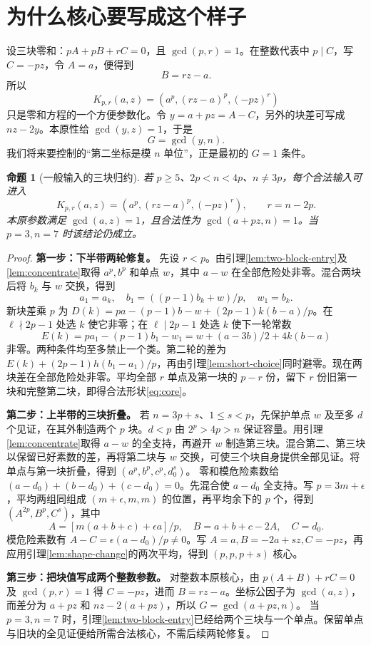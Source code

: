 \documentclass[11pt,a4paper,oneside,openany]{book}
\newtheorem{proposition}[theorem]{命题}
\theoremstyle{definition}
\numberwithin{equation}{chapter}
\begin{document}
\section{为什么核心要写成这个样子}
设三块零和：$pA+pB+rC=0$，且 $\gcd(p,r)=1$。在整数代表中 $p\mid C$，写 $C=-pz$，令 $A=a$，便得到
\[B=rz-a.
\]
所以
\[K_{p,r}(a,z)=(a^p,(rz-a)^p,(-pz)^r)
\]
只是零和方程的一个方便参数化。令 $y=a+pz=A-C$，另外的块差可写成 $nz-2y$。本原性给 $\gcd(y,z)=1$，于是
\[G=\gcd(y,n).
\]
我们将来要控制的“第二坐标是模 $n$ 单位”，正是最初的 $G=1$ 条件。
\begin{proposition}[一般输入的三块归约]\label{prop:entry}
若 $p\ge5$、$2p<n<4p$、$n\ne3p$，每个合法输入可进入
\begin{equation}\label{eq:core}
K_{p,r}(a,z)=(a^p,(rz-a)^p,(-pz)^r),\qquad r=n-2p.
\end{equation}
本原参数满足 $\gcd(a,z)=1$，且合法性为 $\gcd(a+pz,n)=1$。当 $p=3,n=7$ 时该结论仍成立。
\end{proposition}
\begin{proof}
\par\noindent\textbf{第一步：下半带两轮修复。} 先设 $r<p$。由引理\ref{lem:two-block-entry}及\ref{lem:concentrate}取得 $a^p,b^p$ 和单点 $w$，其中 $a-w$ 在全部危险处非零。混合两块后将 $b_k$ 与 $w$ 交换，得到
\[
a_1=a_k,\quad b_1=((p-1)b_k+w)/p,\quad w_1=b_k.
\]
新块差乘 $p$ 为 $D(k)=pa-(p-1)b-w+(2p-1)k(b-a)/p$。在 $\ell\nmid2p-1$ 处选 $k$ 使它非零；在 $\ell\mid2p-1$ 处选 $k$ 使下一轮常数
\[E(k)=pa_1-(p-1)b_1-w_1=w+(a-3b)/2+4k(b-a)
\]
非零。两种条件均至多禁止一个类。第二轮的差为 $E(k)+(2p-1)h(b_1-a_1)/p$，再由引理\ref{lem:short-choice}同时避零。现在两块差在全部危险处非零。平均全部 $r$ 单点及第一块的 $p-r$ 份，留下 $r$ 份旧第一块和完整第二块，即得合法形状\eqref{eq:core}。

\par\noindent\textbf{第二步：上半带的三块折叠。}
若 $n=3p+s$、$1\le s<p$，先保护单点 $w$ 及至多 $d$ 个见证，在其外制造两个 $p$ 块。$d<p$ 由 $2^p>4p>n$ 保证容量。用引理\ref{lem:concentrate}取得 $a-w$ 的全支持，再避开 $w$ 制造第三块。混合第二、第三块以保留已好素数的差，再将第二块与 $w$ 交换，可使三个块自身提供全部见证。将单点与第一块折叠，得到 $(a^p,b^p,c^p,d_0^s)$。
零和模危险素数给 $(a-d_0)+(b-d_0)+(c-d_0)=0$。先混合使 $a-d_0$ 全支持。写 $p=3m+\epsilon$，平均两组同组成 $(m+\epsilon,m,m)$ 的位置，再平均余下的 $p$ 个，得到 $(A^{2p},B^p,C^s)$，其中
\[
A=[m(a+b+c)+\epsilon a]/p,\quad B=a+b+c-2A,\quad C=d_0.
\]
模危险素数有 $A-C=\epsilon(a-d_0)/p\ne0$。写 $A=a,B=-2a+sz,C=-pz$，再应用引理\ref{lem:shape-change}的两次平均，得到 $(p,p,p+s)$ 核心。
\par\noindent\textbf{第三步：把块值写成两个整数参数。}
对整数本原核心，由 $p(A+B)+rC=0$ 及 $\gcd(p,r)=1$ 得 $C=-pz$，进而 $B=rz-a$。坐标公因子为 $\gcd(a,z)$，而差分为 $a+pz$ 和 $nz-2(a+pz)$，所以 $G=\gcd(a+pz,n)$。
当 $p=3,n=7$ 时，引理\ref{lem:two-block-entry}已经给两个三块与一个单点。保留单点与旧块的全见证便给所需合法核心，不需后续两轮修复。
\end{proof}
\end{document}
